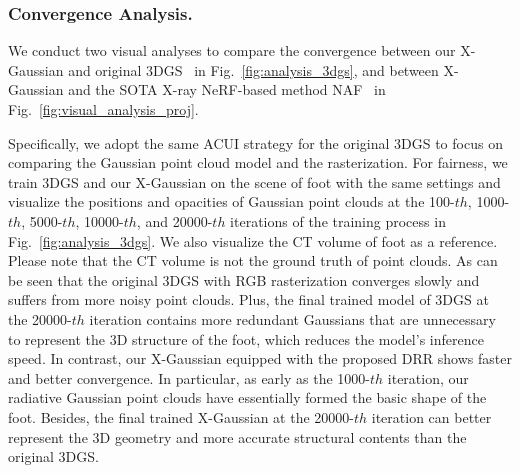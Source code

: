 \documentclass[runningheads]{llncs}
\begin{document}
\vspace{-4.5mm}
\subsubsection{Convergence Analysis.} 
We conduct two visual analyses to compare the convergence between our X-Gaussian and original 3DGS~\cite{3dgs} in Fig.~\ref{fig:analysis_3dgs}, and between X-Gaussian and the SOTA X-ray NeRF-based method NAF~\cite{naf} in Fig.~\ref{fig:visual_analysis_proj}.


Specifically, we adopt the same ACUI strategy for the original 3DGS to focus on comparing the Gaussian point cloud model and the rasterization. For fairness, we train 3DGS and our X-Gaussian on the scene of foot with the same settings and visualize the positions and opacities of Gaussian point clouds at the 100-$th$, 1000-$th$, 5000-$th$, 10000-$th$, and 20000-$th$ iterations of the training process in Fig.~\ref{fig:analysis_3dgs}. We also visualize the CT volume of foot as a reference. Please note that the CT volume is not the ground truth of point clouds. As can be seen that the original 3DGS with RGB rasterization converges slowly and suffers from more noisy point clouds. Plus, the final trained model of 3DGS at the 20000-$th$ iteration contains more redundant Gaussians that are unnecessary to represent the 3D structure of the foot, which reduces the model's inference speed. In contrast, our X-Gaussian equipped with the proposed DRR shows faster and better convergence. In particular, as early as the 1000-$th$ iteration, our radiative Gaussian point clouds have essentially formed the basic shape of the foot. Besides, the final trained X-Gaussian at the 20000-$th$ iteration can better represent the 3D geometry and more accurate structural contents than the original 3DGS.
\end{document}
